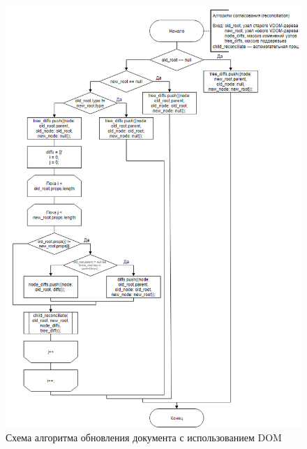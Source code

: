 \begin{figure}[h]
	\centering
	\includegraphics[width=160mm]{img/reconciliation-algorithm.png}
	\caption{Схема алгоритма обновления документа с использованием DOM}
	\label{fig:reconciliation-algorithm}
\end{figure}

